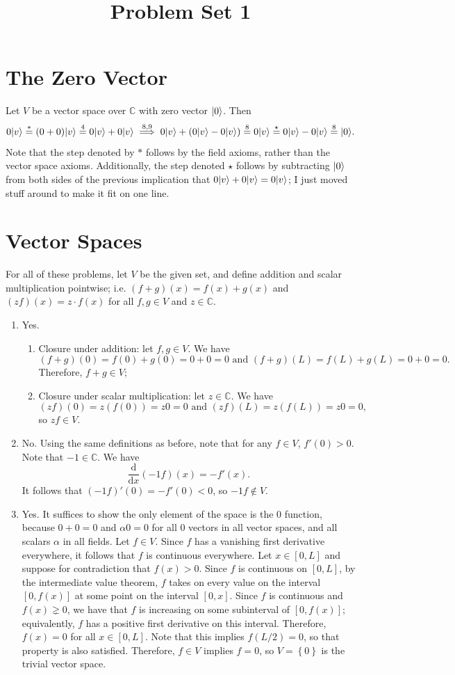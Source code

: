 \documentclass[11pt, letterpaper]{article}
\title{Problem Set 1}
\begin{document}
\makeproblem
\section{The Zero Vector}
Let $V$ be a vector space over $\mathbb{C}$ with zero vector $\lvert0\rangle $. Then
\[
	0 \lvert v\rangle \overset{*}{=} (0+0) \lvert v\rangle  \overset{4}{=} 0 \lvert v\rangle +0 \lvert v\rangle \overset{8,9}{\implies} 0 \lvert v\rangle +(0 \lvert v\rangle -0 \lvert v\rangle) \overset{8}{=} 0 \lvert v\rangle \overset{\star}{=} 0 \lvert v\rangle - 0 \lvert v\rangle  \overset{8}{=}\lvert0\rangle 
.\]
Note that the step denoted by $*$ follows by the field axioms, rather than the vector space axioms. Additionally, the step denoted $\star$ follows by subtracting $ \lvert0\rangle$ from both sides of the previous implication that $0 \lvert v\rangle +0 \lvert v\rangle =0 \lvert v\rangle $; I just moved stuff around to make it fit on one line.
\section{Vector Spaces}
For all of these problems, let $V$ be the given set, and define addition and scalar multiplication pointwise; i.e. $(f+g)(x)=f(x)+g(x)$ and $(zf)(x)=z\cdot f(x)$ for all $f,g\in V$ and $z\in\mathbb{C}$.
\begin{enumerate}
	\item Yes.
		\begin{enumerate}
			\item Closure under addition: let $f,g\in V$. We have
				\[
					(f+g)(0)=f(0)+g(0)=0+0=0 \text{ and }(f+g)(L)=f(L)+g(L)=0+0=0
				.\]
				Therefore, $f+g\in V$;
			\item Closure under scalar multiplication: let $z\in\mathbb{C} $. We have
				\[(zf)(0)=z(f(0))=z0=0 \text{ and }  (zf)(L)=z(f(L))=z0=0,\]
 so $zf\in V$.
		\end{enumerate}
	\item No. Using the same definitions as before, note that for any $f\in V$, $f'(0)>0$. Note that $-1\in\mathbb{C}$. We have
		\[
			\frac{\mathrm{d}}{\mathrm{d}x} (-1f)(x)=-f'(x)
		.\]
		It follows that $(-1f)'(0)=-f'(0)<0$, so $-1f\notin V$.
	\item Yes. It suffices to show the only element of the space is the 0 function, because $0+0=0$ and $\alpha 0=0$ for all $0$ vectors in all vector spaces, and all scalars $\alpha $ in all fields. Let $f\in V$. Since $f$ has a vanishing first derivative everywhere, it follows that $f$ is continuous everywhere. Let $x\in [0,L]$ and suppose for contradiction that $f(x)>0$. Since $f$ is continuous on $[0,L]$, by the intermediate value theorem, $f$ takes on every value on the interval $[0, f(x)]$ at some point on the interval $[0,x]$. Since $f$ is continuous and $f(x) \gneq0$, we have that $f$ is increasing on some subinterval of $[0, f(x)]$; equivalently, $f$ has a positive first derivative on this interval. Therefore, $f(x)=0$ for all $x\in [0,L]$. Note that this implies $f(L/2)=0$, so that property is also satisfied. Therefore, $f\in V$ implies $f=0$, so $V=\left\{ 0 \right\} $ is the trivial vector space.
\end{enumerate}
\end{document}
